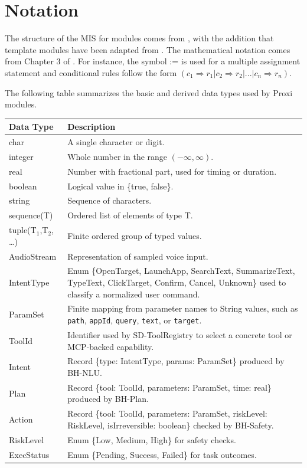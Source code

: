 \documentclass[12pt, titlepage]{article}
\begin{document}
\section{Notation}
\label{Notation}

The structure of the MIS for modules comes from \citet{HoffmanAndStrooper1995},
with the addition that template modules have been adapted from
\cite{GhezziEtAl2003}. The mathematical notation comes from Chapter 3 of
\citet{HoffmanAndStrooper1995}. For instance, the symbol := is used for a
multiple assignment statement and conditional rules follow the form
$(c_1 \Rightarrow r_1 | c_2 \Rightarrow r_2 | ... | c_n \Rightarrow r_n )$.

\noindent The following table summarizes the basic and derived data types used
by Proxi modules.

\begin{center}
\renewcommand{\arraystretch}{1.2}
\noindent
\begin{tabular}{p{3cm} p{10.5cm}}
\toprule
Data Type & Description \\
\midrule
char & A single character or digit.\\
integer & Whole number in the range $(-\infty, \infty)$.\\
real & Number with fractional part, used for timing or duration.\\
boolean & Logical value in \{true, false\}.\\
string & Sequence of characters.\\
sequence(T) & Ordered list of elements of type T.\\
tuple(T$_1$,T$_2$, \ldots) & Finite ordered group of typed values.\\
AudioStream & Representation of sampled voice input.\\
IntentType & Enum \{OpenTarget, LaunchApp, SearchText, SummarizeText,
TypeText, ClickTarget, Confirm, Cancel, Unknown\} used to classify a
normalized user command.\\
ParamSet & Finite mapping from parameter names to String values, such as
\texttt{path}, \texttt{appId}, \texttt{query}, \texttt{text}, or
\texttt{target}.\\
ToolId & Identifier used by SD-ToolRegistry to select a concrete tool or
MCP-backed capability.\\
Intent & Record \{type: IntentType, params: ParamSet\} produced by BH-NLU.\\
Plan & Record \{tool: ToolId, parameters: ParamSet, time: real\} produced
by BH-Plan.\\
Action & Record \{tool: ToolId, parameters: ParamSet, riskLevel: RiskLevel,
isIrreversible: boolean\} checked by BH-Safety.\\
RiskLevel & Enum \{Low, Medium, High\} for safety checks.\\
ExecStatus & Enum \{Pending, Success, Failed\} for task outcomes.\\
\bottomrule
\end{tabular}
\end{center}
\end{document}
